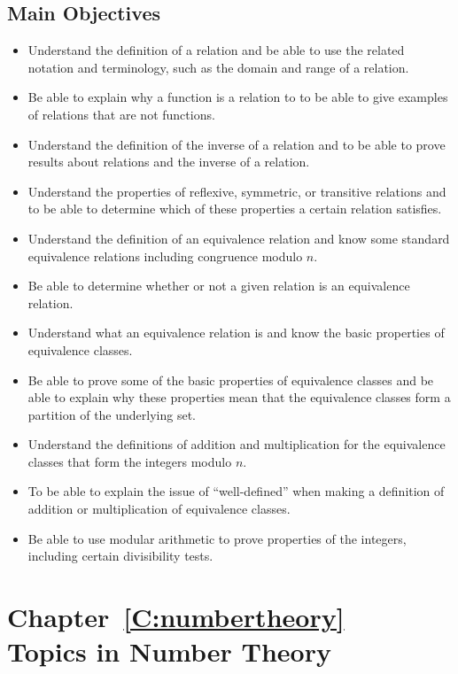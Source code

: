 \section*{Main Objectives}
\begin{itemize}
\item Understand the definition of a relation and be able to use the related notation and terminology, such as the domain and range of a relation.
\item Be able to explain why a function is a relation to to be able to give examples of relations that are not functions.
\item Understand the definition of the inverse of a relation and to be able to prove results about relations and the inverse of a relation.
\item Understand the properties of reflexive, symmetric, or transitive relations and to be able to determine which of these properties a certain relation satisfies.
\item Understand the definition of an equivalence relation and know some standard equivalence relations including congruence modulo $n$.
\item Be able to determine whether or not a given relation is an equivalence relation.
\item Understand what an equivalence relation is and know the basic properties of equivalence classes.
\item Be able to prove some of the basic properties of equivalence classes and be able to explain why these properties mean that the equivalence classes form a partition of the underlying set.
\item Understand the definitions of addition and multiplication for the equivalence classes that form the integers modulo $n$.
\item To be able to explain the issue of ``well-defined'' when making a definition of addition or multiplication of equivalence classes.
\item Be able to use modular arithmetic to prove properties of the integers, including certain divisibility tests.
\end{itemize}
\hbreak






\chapter*{Chapter~\ref{C:numbertheory} \\Topics in Number Theory}

